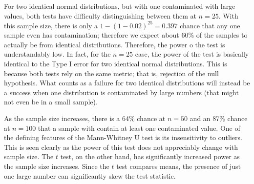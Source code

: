 \documentclass{article}
\begin{document}
For two identical normal distributions, but with one contaminated with large values, both tests have difficulty distinguishing between them at $n = 25$. With this sample size, there is only a $1-(1-0.02)^{25} = 0.397$ chance that any one sample even has contamination; therefore we expect about 60\% of the samples to actually be from identical distributions. Therefore, the power o the test is understandably low. In fact, for the $n=25$ case, the power of the test is basically identical to the Type I error for two identical normal distributions. This is because both tests rely on the same metric; that is, rejection of the null hypothesis. What counts as a failure for two identical distributions will instead be a success when one distribution is contaminated by large numbers (that might not even be in a small sample).

As the sample size increases, there is a 64\% chance at $n=50$ and an 87\% chance at $n=100$ that a sample with contain at least one contaminated value. One of the defining features of the Mann-Whitney U test is its insensitivity to outliers. This is seen clearly as the power of this test does not appreciably change with sample size. The $t$ test, on the other hand, has significantly increased power as the sample size increases. Since the $t$ test compares means, the presence of just one large number can significantly skew the test statistic. 
\end{document}
